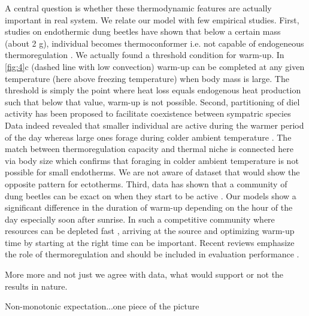 A central question is whether these thermodynamic features are actually important in real system.  
We relate our model with few empirical studies.
First, studies on endothermic dung beetles have shown that below a certain mass (about 2 g), individual becomes thermoconformer i.e. not capable of endogeneous thermoregulation \citep{Bartholomew1978, Verdu2006}.
We actually found a threshold condition for warm-up.
In \cref{fig:4}c (dashed line with low convection) warm-up can be completed at any given temperature (here above freezing temperature) when body mass is large.
The threshold is simply the point where heat loss equals endogenous heat production such that  below that value, warm-up is not possible.
Second, partitioning of diel activity has been proposed to facilitate coexistence between sympatric species \citep{Viljanen2009}
Data indeed revealed that smaller  individual are active during the warmer period of the day whereas large ones forage during colder ambient temperature \citep{May1985}.
The match between thermoregulation capacity and thermal niche is connected here via body size which confirms that foraging in colder ambient temperature is not possible for small endotherms.
We are not aware of dataset that would show the opposite pattern for ectotherms. %
Third, data has shown that a community of dung beetles can be exact on when they start to be active \citep[e.g.,][]{Halffter1966, Caveney1995}.
Our models show a significant difference in the duration of warm-up depending on the hour of the day especially soon after sunrise.
In such a competitive community where resources can be depleted fast \citep{Hanski1991}, arriving at the source and optimizing warm-up time by starting at the right time can be important.
Recent reviews emphasize the role of thermoregulation and should be included in evaluation performance \citep{Dial2008, Kalinkat2015}.

More more and not just we agree with data, what would support or not the results in nature.

Non-monotonic expectation...one piece of the picture

